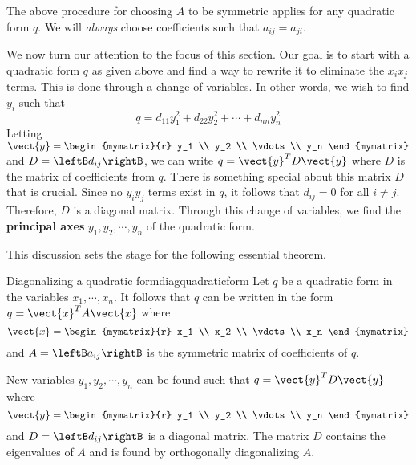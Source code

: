 The above procedure for choosing $A$ to be symmetric applies for any quadratic form $q$. We will \textit{always} choose coefficients such that $a_{ij}=a_{ji}$. 

We now turn our attention to the focus of this section. Our goal is to start with a quadratic form $q$ as given above and find a way to rewrite it to eliminate the $x_ix_j$ terms. This is done through a change of variables. In other words, we wish to find $y_i$ such that 
\[
q = d_{11}y_1^2 + d_{22}y_2^2 + \cdots + d_{nn}y_n^2
\]
 Letting $\vect{y} = \begin{mymatrix}{r}
y_1 \\
y_2 \\
\vdots \\
y_n
\end{mymatrix}$ and $D = \leftB d_{ij} \rightB$, we can write $q = \vect{y}^T D \vect{y}$ where $D$ is the matrix of coefficients from $q$. There is something special about this matrix $D$ that is crucial. Since no $y_iy_j$ terms exist in $q$, it follows that $d_{ij} = 0$ for all $i \neq j$. Therefore, $D$ is a diagonal matrix. Through this change of variables, we find the \textbf{principal axes} $y_1, y_2, \cdots, y_n$ of the quadratic form. 

This discussion sets the stage for the following essential theorem.

\begin{theorem}{Diagonalizing a quadratic form}{diagquadraticform}
Let $q$ be a quadratic form in the variables $x_1, \cdots, x_n$. It follows that $q$ can be written in the form $q = \vect{x}^T A \vect{x}$ where 
\[
\vect{x} = \begin{mymatrix}{r}
x_1 \\
x_2 \\
\vdots \\
x_n
\end{mymatrix} 
\]
and $A = \leftB a_{ij} \rightB$ is the symmetric matrix of coefficients of $q$. 

New variables $y_1, y_2, \cdots, y_n$ can be found such that $q = \vect{y}^T D \vect{y}$ where 
\[
\vect{y} = \begin{mymatrix}{r} 
y_1 \\
y_2 \\
\vdots \\
y_n
\end{mymatrix} \] and $D=\leftB d_{ij} \rightB$ is a diagonal matrix. The matrix $D$ contains the eigenvalues of $A$ and is found by orthogonally diagonalizing $A$. 
\end{theorem}

